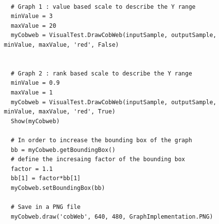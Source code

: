 \textspace\\


\begin{lstlisting}
  # Graph 1 : value based scale to describe the Y range
  minValue = 3
  maxValue = 20
  myCobweb = VisualTest.DrawCobWeb(inputSample, outputSample, minValue, maxValue, 'red', False)


  # Graph 2 : rank based scale to describe the Y range
  minValue = 0.9
  maxValue = 1
  myCobweb = VisualTest.DrawCobWeb(inputSample, outputSample, minValue, maxValue, 'red', True)
  Show(myCobweb)

  # In order to increase the bounding box of the graph
  bb = myCobweb.getBoundingBox()
  # define the incresaing factor of the bounding box
  factor = 1.1
  bb[1] = factor*bb[1]
  myCobweb.setBoundingBox(bb)

  # Save in a PNG file
  myCobweb.draw('cobWeb', 640, 480, GraphImplementation.PNG)
\end{lstlisting}
